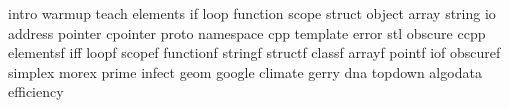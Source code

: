 intro
warmup
teach
elements
if
loop
function
scope
struct
object
array
string
io
address
pointer
cpointer
proto
namespace
cpp
template
error
stl
obscure
ccpp
elementsf
iff
loopf
scopef
functionf
stringf
structf
classf
arrayf
pointf
iof
obscuref
simplex
morex
prime
infect
geom
google
climate
gerry
dna
topdown
algodata
efficiency
